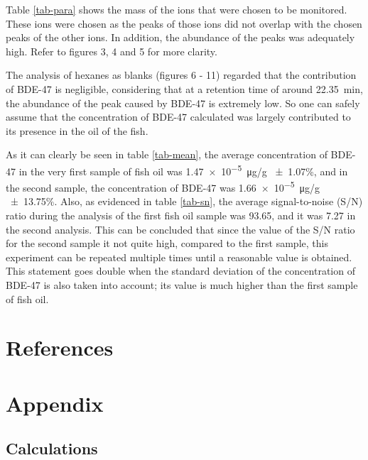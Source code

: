 \documentclass[a4paper, 12pt]{article}
\begin{document}
Table \ref{tab-para} shows the mass of the ions that were chosen to be monitored. These ions were chosen as the peaks of those ions did not overlap with the chosen peaks of the other ions. In addition, the abundance of the peaks was adequately high. Refer to figures 3, 4 and 5 for more clarity.

The analysis of hexanes as blanks (figures 6 - 11) regarded that the contribution of BDE-47 is negligible, considering that at a retention time of around \SI{22.35}{min}, the abundance of the peak caused by BDE-47 is extremely low. So one can safely assume that the concentration of BDE-47 calculated was largely contributed to its presence in the oil of the fish.

As it can clearly be seen in table \ref{tab-mean}, the average concentration of BDE-47 in the very first sample of fish oil was \SI{1.47e-5}{\ug/g} \num{+-1.07}\%, and in the second sample, the concentration of BDE-47 was \SI{1.66e-5}{\ug/g} \num{+-13.75}\%. Also, as evidenced in table \ref{tab-sn}, the average signal-to-noise (S/N) ratio during the analysis of the first fish oil sample was \num{93.65}, and it was \num{7.27} in the second analysis. This can be concluded that since the value of the S/N ratio for the second sample it not quite high, compared to the first sample, this experiment can be repeated multiple times until a reasonable value is obtained. This statement goes double when the standard deviation of the concentration of BDE-47 is also taken into account; its value is much higher than the first sample of fish oil.


\section{References}
\printbibliography


\section{Appendix}

\subsection{Calculations}
\end{document}
